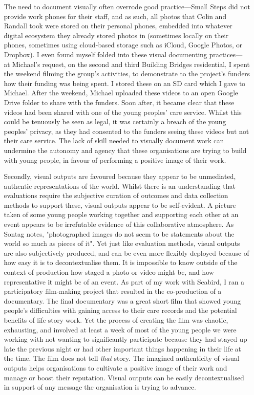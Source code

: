 The need to document visually often overrode good practice—Small Steps did not provide work phones for their staff, and as such, all photos that Colin and Randall took were stored on their personal phones, embedded into whatever digital ecosystem they already stored photos in (sometimes locally on their phones, sometimes using cloud-based storage such as iCloud, Google Photos, or Dropbox). I even found myself folded into these visual documenting practices— at Michael's request, on the second and third Building Bridges residential, I spent the weekend filming the group's activities, to demonstrate to the project's funders how their funding was being spent. I stored these on an SD card which I gave to Michael. After the weekend, Michael uploaded these videos to an open Google Drive folder to share with the funders. Soon after, it became clear that these videos had been shared with one of the young peoples’ care service. Whilst this could be tenuously be seen as legal, it was certainly a breach of the young peoples’ privacy, as they had consented to the funders seeing these videos but not their care service. The lack of skill needed to visually document work can undermine the autonomy and agency that these organisations are trying to build with young people, in favour of performing a positive image of their work. 

Secondly, visual outputs are favoured because they appear to be unmediated, authentic representations of the world. Whilst there is an understanding that evaluations require the subjective curation of outcomes and data collection methods to support these, visual outputs appear to be self-evident. A picture taken of some young people working together and supporting each other at an event appears to be irrefutable evidence of this collaborative atmosphere. As  Sontag \citeyearpar[p. 174]{sontag_photography_1996} notes, "photographed images do not seem to be statements about the world so much as pieces of it". Yet just like evaluation methods, visual outputs are also subjectively produced, and can be even more flexibly deployed because of how easy it is to decontextualise them. It is impossible to know outside of the context of production how staged a photo or video might be, and how representative it might be of an event. As part of my work with Seabird, I ran a participatory film-making project that resulted in the co-production of a documentary. The final documentary was a great short film that showed young people's difficulties with gaining access to their care records and the potential benefits of life story work. Yet the process of creating the film was chaotic, exhausting, and involved at least a week of most of the young people we were working with not wanting to significantly participate because they had stayed up late the previous night or had other important things happening in their life at the time. The film does not tell \emph{that} story. The imagined authenticity of visual outputs helps organisations to cultivate a positive image of their work and manage or boost their reputation. Visual outputs can be easily decontextualised in support of any message the organisation is trying to advance.

